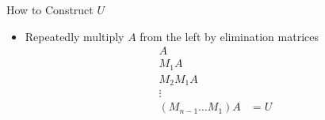 \documentclass[10pt]{beamer}
\begin{document}
\begin{frame}{How to Construct $U$}
\begin{itemize}
    \item Repeatedly multiply $A$ from the left by elimination matrices 
        \begin{align*}
         A & \\
         M_1A  &\\
         M_2 M_1A  &\\
                  \vdots  &\\ 
         (M_{n-1} \dots M_1)A & = U
        \end{align*}
\end{itemize}



\end{frame}


\end{document}
